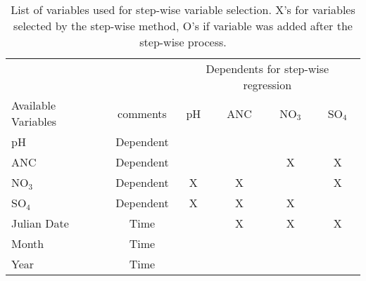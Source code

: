 \begin{table}[htbp]
\centering
\caption[List of variables used for step-wise variable selection.]{List of variables used for step-wise variable selection.  X's for variables selected by the step-wise method, O's if variable was added after the step-wise process.}
\begin{tabular}{lccccc}
\toprule
                                      &                    & \multicolumn{ 4}{c}{Dependents for step-wise regression}                                                                                                                                               \\ \cline{3-6}\noalign{\smallskip}
Available Variables         & comments  & \multicolumn{1}{p{1.2cm}}{pH} &\multicolumn{1}{p{1.2cm}}{ANC} & \multicolumn{1}{p{1.2cm}}{NO$_3$} & \multicolumn{1}{p{1.2cm}}{SO$_4$} \\ 
\midrule
pH                                  & Dependent &                                                     &                                                      &                                                              &  \\ 
ANC                               &Dependent  &                                                     &                                                      & X                                                           & X \\ 
NO$_3$                         &Dependent  & X                                                  & X                                                   &                                                              & X \\ 
SO$_4$                         &Dependent  &X                                                   & X                                                   & X                                                            &  \\ 
Julian Date                    &Time               &                                                      &X                                                    &X                                                             & X \\ 
Month                            &Time                   &                                                      &                                                     &                                                                &  \\ 
Year                               &Time                 &                                                      &                                                     &                                                                &  \\ 

\end{tabular}
\end{table}
